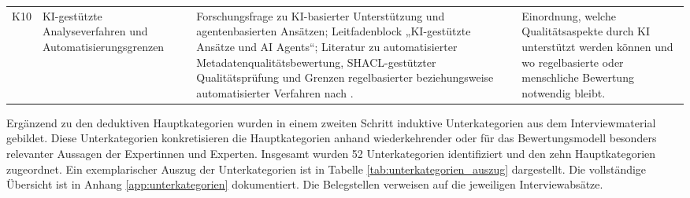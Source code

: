\begin{center}
\begin{longtable}{p{} p{} p{} p{}}
K10 & KI-gestützte Analyseverfahren und Automatisierungsgrenzen & Forschungsfrage zu KI-basierter Unterstützung und agentenbasierten Ansätzen; Leitfadenblock „KI-gestützte Ansätze und AI Agents“; Literatur zu automatisierter Metadatenqualitätsbewertung, SHACL-gestützter Qualitätsprüfung und Grenzen regelbasierter beziehungsweise automatisierter Verfahren nach \cite{Neumaier2016MetadataQuality, wentzel2023extensive, corteslasalle_shacl_dqa, Gayo2015LinkedDataValidationQuality, Zaveri2016LinkedDataQuality, BernersLee2006LinkedData}. & Einordnung, welche Qualitätsaspekte durch KI unterstützt werden können und wo regelbasierte oder menschliche Bewertung notwendig bleibt. \\

\end{longtable}
\end{center}
\normalsize

Ergänzend zu den deduktiven Hauptkategorien wurden in einem zweiten Schritt induktive Unterkategorien aus dem Interviewmaterial gebildet. Diese Unterkategorien konkretisieren die Hauptkategorien anhand wiederkehrender oder für das Bewertungsmodell besonders relevanter Aussagen der Expertinnen und Experten. Insgesamt wurden 52 Unterkategorien identifiziert und den zehn Hauptkategorien zugeordnet.
Ein exemplarischer Auszug der Unterkategorien ist in Tabelle \ref{tab:unterkategorien_auszug} dargestellt.
Die vollständige Übersicht ist in Anhang \ref{app:unterkategorien} dokumentiert.
Die Belegstellen verweisen auf die jeweiligen Interviewabsätze.

\pagebreak

